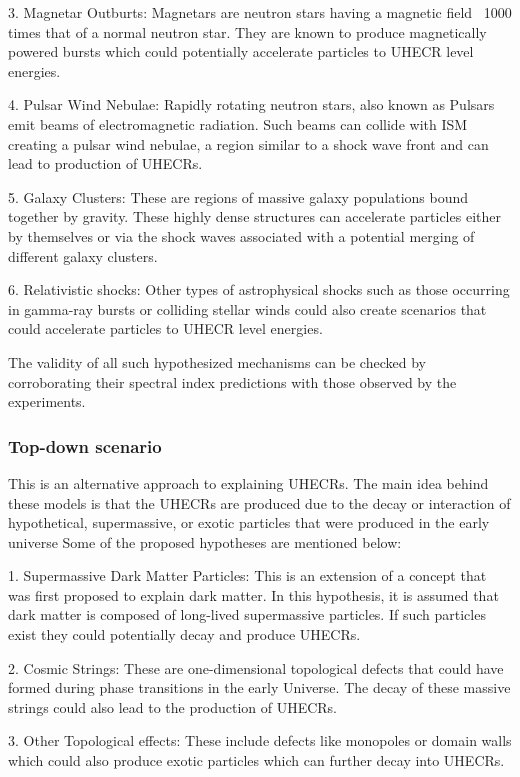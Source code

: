3. Magnetar Outburts: Magnetars are neutron stars having a magnetic field ~1000 times that of a normal neutron star. They are known to produce magnetically powered bursts which could potentially accelerate particles to UHECR level energies.

4. Pulsar Wind Nebulae: Rapidly rotating neutron stars, also known as Pulsars emit beams of electromagnetic radiation. Such beams can collide with ISM creating a pulsar wind nebulae, a region similar to a shock wave front and can lead to production of UHECRs.

5. Galaxy Clusters: These are regions of massive galaxy populations bound together by gravity. These highly dense structures can accelerate particles either by themselves or via the shock waves associated with a potential merging of different galaxy clusters. 

6. Relativistic shocks: Other types of astrophysical shocks such as those occurring in gamma-ray bursts or colliding stellar winds could also create scenarios that could accelerate particles to UHECR level energies.

The validity of all such hypothesized mechanisms can be checked by corroborating their spectral index predictions with those observed by the experiments. 

\subsubsection{Top-down scenario}
\label{subsec:Tdownsce}
This is an alternative approach to explaining UHECRs. The main idea behind these models is that the UHECRs are produced due to the decay or interaction of hypothetical, supermassive, or exotic particles that were produced in the early universe Some of the proposed hypotheses are mentioned below:


1. Supermassive Dark Matter Particles: This is an extension of a concept that was first proposed to explain dark matter. In this hypothesis, it is assumed that dark matter is composed of long-lived supermassive particles. If such particles exist they could potentially decay and produce UHECRs.

2. Cosmic Strings: These are one-dimensional topological defects that could have formed during phase transitions in the early Universe. The decay of these massive strings could also lead to the production of UHECRs.

3. Other Topological effects: These include defects like monopoles or domain walls which could also produce exotic particles which can further decay into UHECRs. 

